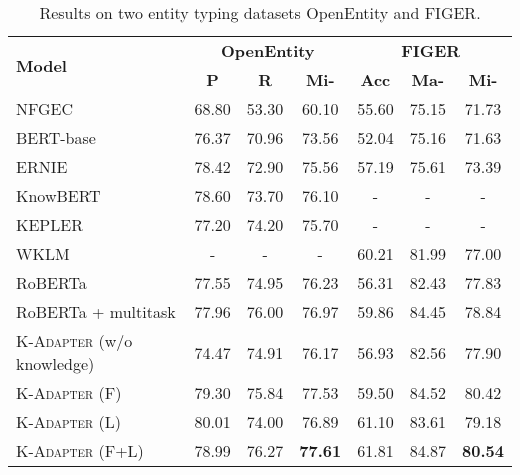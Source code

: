 \documentclass[11pt,a4paper]{article}
\begin{document}
\begin{table*}[!t]
\centering
\small
\begin{tabular}{@{}l|ccc|ccc@{}}
\toprule
\multirow{2}{*}{\textbf{Model}} & \multicolumn{3}{c|}{\textbf{OpenEntity}} & \multicolumn{3}{c}{\textbf{FIGER}} \\ \cmidrule(l){2-7} 
 & \textbf{P} & \textbf{R} & \textbf{Mi-} & \textbf{Acc} & \textbf{Ma-} & \textbf{Mi-} \\ \midrule
NFGEC \citep{shimaoka2016attentive} & 68.80 & 53.30 & 60.10 & 55.60 & 75.15 & 71.73 \\ 
BERT-base \citep{zhang2019ernie} & 76.37 & 70.96 & 73.56 & 52.04 & 75.16 & 71.63 \\
ERNIE \citep{zhang2019ernie} & 78.42 & 72.90 & 75.56 & 57.19 & 75.61 & 73.39 \\
KnowBERT \citep{peters2019knowledge} & 78.60 & 73.70 & 76.10 & - & - & - \\
KEPLER \citep{wang2019kepler} & 77.20 & 74.20 & 75.70 & - & - & - \\
WKLM \citep{xiong2019pretrained} & - & - & - & 60.21 & 81.99 & 77.00 \\ \midrule
RoBERTa & 77.55 & 74.95 & 76.23 & 56.31 & 82.43 & 77.83 \\
RoBERTa + multitask & 77.96 & 76.00 & 76.97 & 59.86 & 84.45 & 78.84 \\

\textsc{K-Adapter} (w/o knowledge) & 74.47 & 74.91 & 76.17 & 56.93 & 82.56 & 77.90 \\
\textsc{K-Adapter} (F) & 79.30 & 75.84 & 77.53 & 59.50 & 84.52 & 80.42 \\
\textsc{K-Adapter} (L) & 80.01 & 74.00 & 76.89 & 61.10 & 83.61 & 79.18 \\
\textsc{K-Adapter} (F+L) & 78.99 & 76.27 & \textbf{77.61} & 61.81 & 84.87 & \textbf{80.54} \\
 \bottomrule
\end{tabular}\caption{Results on two entity typing datasets OpenEntity and FIGER.}
\label{tab:entity_typing}
\vspace{-2mm}
\end{table*}
\end{document}
